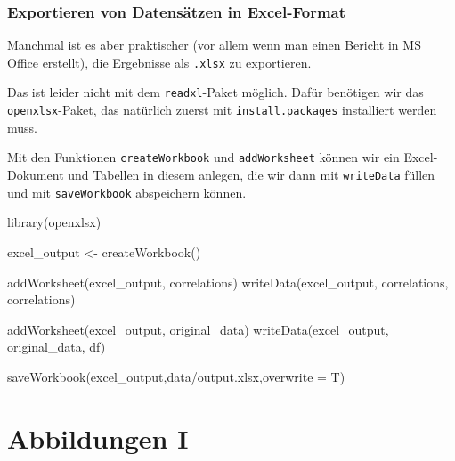 \documentclass[
]{book}
\newenvironment{Shaded}{\begin{snugshade}}{\end{snugshade}}
\newcommand{\AttributeTok}[1]{\textcolor[rgb]{0.77,0.63,0.00}{#1}}
\newcommand{\FunctionTok}[1]{\textcolor[rgb]{0.00,0.00,0.00}{#1}}
\newcommand{\NormalTok}[1]{#1}
\newcommand{\OtherTok}[1]{\textcolor[rgb]{0.56,0.35,0.01}{#1}}
\newcommand{\StringTok}[1]{\textcolor[rgb]{0.31,0.60,0.02}{#1}}
\begin{document}
\hypertarget{exportieren-von-datensuxe4tzen-in-excel-format}{%
\subsection{Exportieren von Datensätzen in Excel-Format}\label{exportieren-von-datensuxe4tzen-in-excel-format}}

Manchmal ist es aber praktischer (vor allem wenn man einen Bericht in MS Office erstellt), die Ergebnisse als \texttt{.xlsx} zu exportieren.

Das ist leider nicht mit dem \texttt{readxl}-Paket möglich. Dafür benötigen wir das \texttt{openxlsx}-Paket, das natürlich zuerst mit \texttt{install.packages} installiert werden muss.

Mit den Funktionen \texttt{createWorkbook} und \texttt{addWorksheet} können wir ein Excel-Dokument und Tabellen in diesem anlegen, die wir dann mit \texttt{writeData} füllen und mit \texttt{saveWorkbook} abspeichern können.

\begin{Shaded}
\begin{Highlighting}[]
\FunctionTok{library}\NormalTok{(openxlsx)}

\NormalTok{excel\_output }\OtherTok{\textless{}{-}} \FunctionTok{createWorkbook}\NormalTok{()}

\FunctionTok{addWorksheet}\NormalTok{(excel\_output, }\StringTok{\textquotesingle{}correlations\textquotesingle{}}\NormalTok{)}
\FunctionTok{writeData}\NormalTok{(excel\_output, }\StringTok{\textquotesingle{}correlations\textquotesingle{}}\NormalTok{, correlations)}

\FunctionTok{addWorksheet}\NormalTok{(excel\_output, }\StringTok{\textquotesingle{}original\_data\textquotesingle{}}\NormalTok{)}
\FunctionTok{writeData}\NormalTok{(excel\_output, }\StringTok{\textquotesingle{}original\_data\textquotesingle{}}\NormalTok{, df)}

\FunctionTok{saveWorkbook}\NormalTok{(excel\_output,}\StringTok{\textquotesingle{}data/output.xlsx\textquotesingle{}}\NormalTok{,}\AttributeTok{overwrite =}\NormalTok{ T)}
\end{Highlighting}
\end{Shaded}

\hypertarget{abbildungen-i}{%
\chapter{Abbildungen I}\label{abbildungen-i}}
\end{document}
